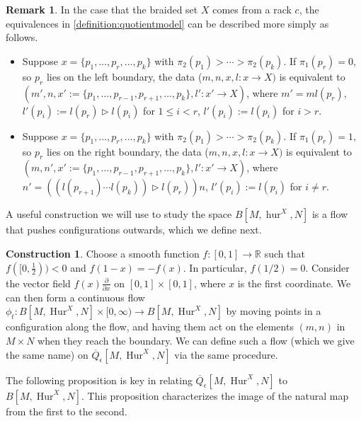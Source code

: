 \documentclass[12 pt]{amsart}
\theoremstyle{plain}
\theoremstyle{definition}
\newtheorem{construction}[theorem]{Construction}
\newtheorem{remark}[theorem]{Remark}
\theoremstyle{remark}
\numberwithin{equation}{section}
\DeclareMathOperator\Hur{Hur}
\newcommand\RR{\mathbb{R}}
\begin{document}
\begin{remark}\label{remark:eqrelation}
	In the case that the braided set $X$ comes from a rack $c$, the equivalences
	in \autoref{definition:quotientmodel} can be described more simply as
	follows.
	\begin{itemize}
		\item[$(i)$] 			Suppose $x = \{p_1, \ldots, p_r,\ldots, p_k\}$ with $\pi_2(p_1) >
		\cdots > \pi_2(p_k)$. If $\pi_1(p_r) = 0$, so $p_r$ lies
		on the left boundary, the data ($m,n,x,l:x \to X)$ is
		equivalent to $(m', n, x' := \{p_1, \ldots, p_{r-1},  p_{r+1},
		\ldots, p_k\}, l': x'\to X)$, where $m' = ml(p_r)$, $l'(p_i) :=
		l(p_r)\triangleright l(p_i)$ for $1 \leq i < r$, $l'(p_i) := l(p_i)$ for $i > r$.
		
		
\item[$(ii)$] Suppose $x = \{p_1, \ldots, p_r,\ldots, p_k\}$ with
$\pi_2(p_1) >
\cdots > \pi_2(p_k)$. If $\pi_1(p_r) = 1$, so $p_r$ lies
on the right boundary, the data ($m,n,x,l:x \to X)$ is
equivalent to $(m, n', x' := \{p_1, \ldots, p_{r-1},  p_{r+1},
\ldots, p_k\}, l': x'\to X)$, where $n' = ((l(p_{r+1})\cdots l(p_{k}))\triangleright l(p_r))n$, $l'(p_i) := l(p_i)$ for $i \neq r$.
	\end{itemize}
\end{remark}


A useful construction we will use to study the space
$B[M,\operatorname{hur}^{X},N]$ is a flow that pushes configurations outwards,
which we define next.
\begin{construction}\label{construction:flow}
	Choose a smooth function $f:[0,1] \to \RR$ such that $f([0,\frac 1 2))
	<0$ and $f(1-x)=-f(x)$. In particular, $f(1/2) = 0$. Consider the vector field $f(x)\frac{\partial}{\partial x}$ on $[0,1]\times [0,1]$, where $x$ is the first coordinate. We can then form a continuous flow $\phi_t:B[M,\Hur^{X},N]\times [0,\infty) \to B[M,\Hur^{X},N]$ by moving points in a configuration along the flow, and having them act on the elements $(m,n)$ in $M\times N$ when they reach the boundary. We can define such a flow (which we give the same name) on $\overline{Q}_{\epsilon}[M,\Hur^X,N]$ via the same procedure.
\end{construction}

The following proposition is key in relating
$\overline{Q}_{\epsilon}[M,\Hur^X,N]$ to $B[M,\Hur^X,N]$. This proposition characterizes the
image of the natural map from the first to the second. 
\end{document}
